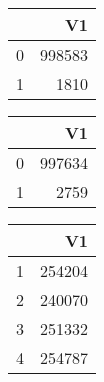 \bigskip\bigskip
\centering
\begin{tabular}{rr}
  \hline
 & V1 \\ 
  \hline
0 & 998583 \\ 
  1 & 1810 \\ 
   \hline
\end{tabular}

\bigskip\bigskip
\centering
\begin{tabular}{rr}
  \hline
 & V1 \\ 
  \hline
0 & 997634 \\ 
  1 & 2759 \\ 
   \hline
\end{tabular}

\bigskip\bigskip
\centering
\begin{tabular}{rr}
  \hline
 & V1 \\ 
  \hline
1 & 254204 \\ 
  2 & 240070 \\ 
  3 & 251332 \\ 
  4 & 254787 \\ 
   \hline
\end{tabular}


